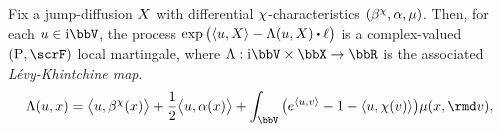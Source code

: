 \begin{proposition}
  \label{proposition:LK}
  Fix a jump-diffusion $X$ with differential $\chi$-characteristics $(\beta^\chi, \alpha, \mu)$.
  Then, for each $\momentVar \in \im\vecSpace$, the process $\exp\big(\prj{\momentVar}{\X} - \ode(\momentVar, \X) \shortInt \leb\big)$ is a complex-valued $(\Prb, \scrF)$ local martingale, where $\ode: \im\vecSpace \times \stateSpace \rightarrow \bbR$ is the associated \emph{L\'evy-Khintchine map}.
  \begin{equation*}
    \ode(\momentVar, \stateVar) = \bprj{\momentVar}{\affDrift^\trunc(\stateVar)} + \frac12\bprj{\momentVar}{\affDiff(\stateVar)} + \int_\vecSpace \big( e^\prj{\momentVar}{\markVar} - 1 - \prj{\momentVar}{\trunc(\markVar)} \big) \affJump(\stateVar, \rmd\markVar),
  \end{equation*}
\end{proposition}
